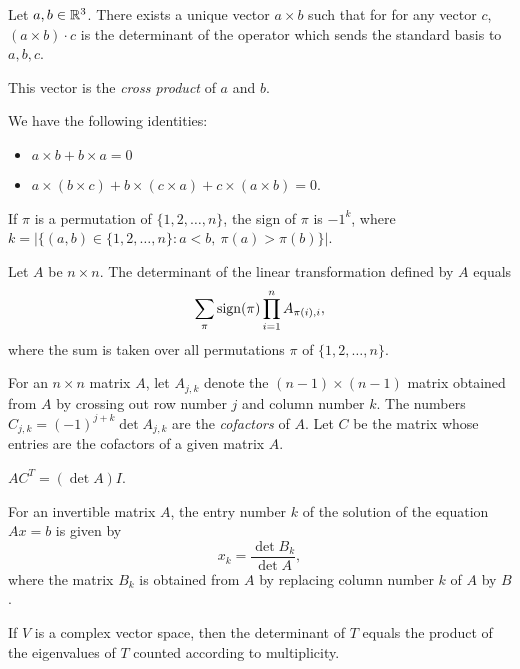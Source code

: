 \begin{prop}
    Let $a,b\in\mathbb{R}^3$. There exists a unique vector $a\times b$ such that for
    for any vector $c$, $(a\times b)\cdot c$ is the determinant of the operator
    which sends the standard basis to $a,b,c$.
\end{prop}
\begin{defn}
    This vector is the \emph{cross product} of $a$ and $b$.
\end{defn}
\begin{prop}
    We have the following identities:
    \begin{itemize}
        \item $a\times b+b\times a=0$
        \item $a\times(b\times c)+b\times(c\times a)+c\times(a\times b)=0$.
    \end{itemize}
\end{prop}
\begin{defn}
  If $\pi$ is a permutation of $\{1,2,\ldots,n\}$, the sign of $\pi$ is $-1^k$,
  where $k=|\{(a,b)\in\{1,2,\ldots,n\}:a<b,\ \pi(a)>\pi(b)\}|$.
\end{defn}
\begin{prop}
  Let $A$ be $n\times n$. The determinant of the linear transformation defined
  by $A$ equals
  \[\sum_\pi\mathrm{sign}(\pi)\prod_{i=1}^n A_{\pi(i),i},\] 
  where the sum is taken over all permutations $\pi$ of $\{1,2,\ldots,n\}$.
\end{prop}
\begin{defn}
  For an $n\times n$ matrix $A$, let $A_{j,k}$ denote the $(n-1)\times(n-1)$
  matrix obtained from $A$ by crossing out row number $j$ and column number $k$.
  The numbers $C_{j,k}=(-1)^{j+k}\det A_{j,k}$ are the \emph{cofactors} of $A$.
  Let $C$ be the matrix whose entries are the cofactors of a given matrix $A$.
\end{defn}
\begin{thm}
  $AC^T=(\det A)I$.
\end{thm}
\begin{cor}
  For an invertible matrix $A$, the entry number $k$ of the solution of the
  equation $Ax=b$ is given by
  \[x_k=\frac{\det B_k}{\det A},\]
  where the matrix $B_k$ is obtained from $A$ by replacing column number $k$ of
  $A$ by $B$.
\end{cor}
\begin{prop}
  If $V$ is a complex vector space, then the determinant of $T$ equals the product of the
  eigenvalues of $T$ counted according to multiplicity.
\end{prop}
